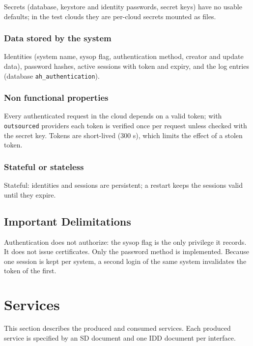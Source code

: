 \documentclass[a4paper]{arrowhead}
\begin{document}
Secrets (database, keystore and identity passwords, secret keys) have no usable defaults; in the test clouds they are per-cloud secrets mounted as files.

\subsubsection{Data stored by the system}

Identities (system name, sysop flag, authentication method, creator and update data), password hashes, active sessions with token and expiry, and the log entries (database \texttt{ah\_\allowbreak{}authentication}).

\subsubsection{Non functional properties}

Every authenticated request in the cloud depends on a valid token; with \texttt{outsourced} providers each token is verified once per request unless checked with the secret key. Tokens are short-lived (300 s), which limits the effect of a stolen token.

\subsubsection{Stateful or stateless}

Stateful: identities and sessions are persistent; a restart keeps the sessions valid until they expire.

\subsection{Important Delimitations}
\label{sec:delimitations}

Authentication does not authorize: the sysop flag is the only privilege it records. It does not issue certificates. Only the password method is implemented. Because one session is kept per system, a second login of the same system invalidates the token of the first.

\newpage

\section{Services}
\label{sec:services}

This section describes the produced and consumed services. Each produced service is specified by an SD document and one IDD document per interface.
\end{document}
